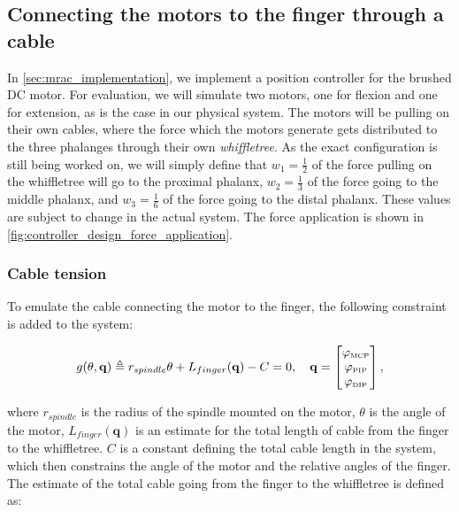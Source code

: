 \subsection{Connecting the motors to the finger through a cable}%
\label{subsec:connecting_motor_and_finger}

In \cref{sec:mrac_implementation}, we implement a position controller for the brushed DC motor. For evaluation, we will simulate two motors, one for flexion and one for extension, as is the case in our physical system. The motors will be pulling on their own cables, where the force which the motors generate gets distributed to the three phalanges through their own \textit{whiffletree}. As the exact configuration is still being worked on, we will simply define that $w_1 = \frac{1}{2}$ of the force pulling on the whiffletree will go to the proximal phalanx, $w_2 = \frac{1}{3}$ of the force going to the middle phalanx, and $w_3 = \frac{1}{6}$ of the force going to the distal phalanx. These values are subject to change in the actual system. The force application is shown in \cref{fig:controller_design_force_application}. 

\subsubsection{Cable tension}
\label{subsec:cable_tension}

To emulate the cable connecting the motor to the finger, the following constraint is added to the system:

\begin{equation}
    g(\theta, \mathbf{q}) \triangleq r_{spindle} \theta + L_{finger}(\mathbf{q}) - C = 0, \quad \mathbf{q} = \begin{bmatrix}
        \varphi_{{\scriptscriptstyle\mathrm{MCP}}}\\
        \varphi_{{\scriptscriptstyle\mathrm{PIP}}}\\
        \varphi_{{\scriptscriptstyle\mathrm{DIP}}}
    \end{bmatrix},
\end{equation}

where $r_{spindle}$ is the radius of the spindle mounted on the motor, $\theta$ is the angle of the motor, $L_{finger}(\mathbf{q})$ is an estimate for the total length of cable from the finger to the whiffletree. $C$ is a constant defining the total cable length in the system, which then constrains the angle of the motor and the relative angles of the finger. The estimate of the total cable going from the finger to the whiffletree is defined as:

